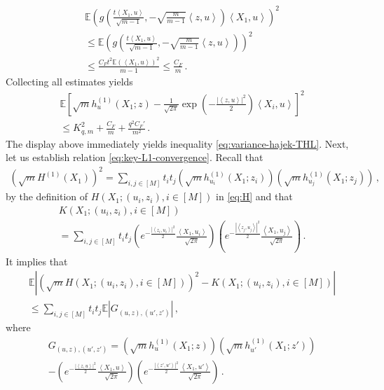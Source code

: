 \documentclass[12pt]{article}
\renewcommand{\exp}[1]{\operatorname{exp}\left(#1\right)} %
\def\l{\left}
\def\r{\right}
\newcommand{\mb}{\mathbb}
\newcommand{\dotp}[2]{\left\langle#1,#2\right\rangle}
\theoremstyle{thmstyletwo}%
\theoremstyle{thmstylethree}%
\begin{document}
    \begin{multline*}
        \mb E \l(g\l(\frac{t\dotp{X_1}{u}}{\sqrt{m-1}}, - \sqrt{\frac{m}{m-1}}\dotp{z}{u}\r) \dotp{X_1}{u}\r)^2 \\
        \leq \mb E \l(g\l(\frac{t\dotp{X_1}{u}}{\sqrt{m-1}}, - \sqrt{\frac{m}{m-1}}\dotp{z}{u}\r)\r)^2 \\
        \leq \frac{C_F t^2 \mb E \l(\dotp{X_1}{u}\r)^2}{m-1} \leq \frac{C_F}{m}\,.
    \end{multline*}
    Collecting all estimates yields
    \begin{multline}\label{eq:convergence-L2}
        \mb E\l[\sqrt{m}h^{(1)}_{u}(X_1;z) - \frac{1}{\sqrt{2\pi}}\exp{-\frac{\l\lvert \dotp{z}{u}\r\rvert^2}{2}}\dotp{X_i}{u}\r]^2 \\
        \leq K_{q,m}^2 + \frac{C_F}{m} + \frac{q^2C_F'}{m^2}\,.
    \end{multline}
    The display above immediately yields inequality \eqref{eq:variance-hajek-THL}. Next, let us establish relation \eqref{eq:key-L1-convergence}. Recall that 
\begin{align*}
    \l(\sqrt{m} H^{(1)}(X_1)\r)^2 =  \sum_{i, j \in [M]} t_i t_{j} \l(\sqrt{m} h^{(1)}_{u_i} (X_1; z_i)\r)\l(\sqrt{m} h^{(1)}_{u_{j}} (X_1;z_j)\r)\,,
\end{align*}
by the definition of $H(X_1; (u_i, z_i), i \in [M])$ in \eqref{eq:H} and that
\begin{multline*}
    K(X_1; (u_i, z_i), i \in [M]) \\
    = \sum_{i, j \in [M]} t_i t_{j} \l(e^{-\frac{\l\lvert \dotp{z_i}{u_i}\r\rvert^2}{2}}\frac{\dotp{X_1}{u_i}}{\sqrt{2\pi}}\r)\l(e^{-\frac{\l\lvert \dotp{z_{j}}{u_{j}}\r\rvert^2}{2}}\frac{\dotp{X_1}{u_j}}{\sqrt{2\pi}}\r)\,.
\end{multline*}
It implies that
\begin{multline}\label{eq:quadratic-form-with-G}
    \mb E \l\lvert  \l(\sqrt{m} H(X_1; (u_i, z_i), i \in [M])\r)^2 - K(X_1; (u_i, z_i), i \in [M]) \r\rvert \\
    \leq \sum_{i, j \in [M]} t_i t_{j} \mb E \l\lvert G_{(u,z), (u',z')} \r\rvert\,,
\end{multline}
where
    \begin{multline*}
    G_{(u,z), (u',z')} = \l(\sqrt{m} h^{(1)}_{u} (X_1;z)\r)\l(\sqrt{m} h^{(1)}_{u'} (X_1;z')\r) \\
    - \l(e^{-\frac{\l\lvert \dotp{z}{u}\r\rvert^2}{2}}\frac{\dotp{X_1}{u}}{\sqrt{2\pi}}\r)\l(e^{-\frac{\l\lvert \dotp{z'}{u'}\r\rvert^2}{2}}\frac{\dotp{X_1}{u'}}{\sqrt{2\pi}}\r)\,.
    \end{multline*} 
\end{document}
